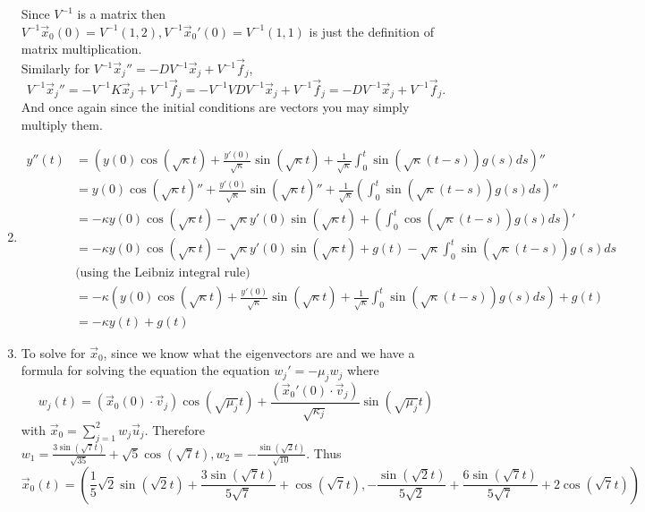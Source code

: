 \documentclass[12pt, letterpaper]{article}
\begin{document}
\begin{enumerate}
$$	 $$
	 Since $V^{-1}$ is a matrix then $V^{-1} \Vec{x}_0 (0) = V^{-1}(1,2),V^{-1} \Vec{x}_0' (0) = V^{-1}(1,1)$ is just the definition of matrix multiplication.\\
	 Similarly for $V^{-1} \Vec{x}_j'' = - D V^{-1} \Vec{x}_j + V^{-1} \Vec{f}_j$,
	 $$
			 V^{-1}\Vec{x}_j'' = 	-V^{-1} K \Vec{x}_j + V^{-1} \Vec{f}_j = - V^{-1} V D V^{-1} \Vec{x}_j  + V^{-1} \Vec{f}_j = -D V^{-1}\Vec{x}_j + V^{-1} \Vec{f}_j.  
	 $$
	 And once again since the initial conditions are vectors you may simply multiply them.
	 \item 
	 \begin{align*}
	 	y''(t) &= (y(0) \cos(\sqrt{\kappa} t) + \frac{y'(0)}{\sqrt{\kappa}}\sin(\sqrt{\kappa} t) + \frac{1}{\sqrt{\kappa}}\int_0^t \sin(\sqrt{\kappa} (t-s)) g(s) ds)''\\
	 	&= y(0) \cos(\sqrt{\kappa} t)'' + \frac{y'(0)}{\sqrt{\kappa}}\sin(\sqrt{\kappa} t)'' + \frac{1}{\sqrt{\kappa}}(\int_0^t \sin(\sqrt{\kappa} (t-s)) g(s) ds)''\\
	 	&= -\kappa y(0) \cos(\sqrt{\kappa} t) - \sqrt{\kappa} y'(0) \sin(\sqrt{\kappa} t) + (\int_0^t \cos(\sqrt{\kappa} (t-s)) g(s) ds)'\\
	 	&= -\kappa y(0) \cos(\sqrt{\kappa} t) - \sqrt{\kappa} y'(0) \sin(\sqrt{\kappa} t) + g(t) - \sqrt{\kappa} \int_0^t \sin(\sqrt{\kappa} (t-s)) g(s) ds \\ 
	 	&\text{(using the Leibniz integral rule)}\\
	 	&= -\kappa(y(0) \cos(\sqrt{\kappa} t) + \frac{y'(0)}{\sqrt{\kappa}}\sin(\sqrt{\kappa} t) + \frac{1}{\sqrt{\kappa}}\int_0^t \sin(\sqrt{\kappa} (t-s)) g(s) ds) + g(t) \\
	 	&= -\kappa y(t) + g(t)
	 \end{align*}
	 \item To solve for $\Vec{x}_0$, since we know what the eigenvectors are and we have a formula for solving the equation the equation $w_j' = -\mu_j w_j$ where 
	 $$
	 	w_j (t) = (\Vec{x}_0 (0) \cdot \Vec{v}_j)\cos(\sqrt{\mu_j} t) + \frac{(\Vec{x}_0' (0) \cdot \Vec{v}_j)}{\sqrt{\kappa_j}} \sin(\sqrt{\mu_j} t)	 
	 $$
	 with $\Vec{x}_0 = \sum_{j=1}^2 w_j \Vec{u}_j$.  Therefore 
	 $ w_1 = \frac{3 \sin \left(\sqrt{7} t\right)}{\sqrt{35}}+\sqrt{5} \cos \left(\sqrt{7}
   t\right),w_2 = -\frac{\sin \left(\sqrt{2} t\right)}{\sqrt{10}}$.
   Thus 
   $$
	\Vec{x}_0 (t) = \left(\frac{1}{5} \sqrt{2} \sin (\sqrt{2} t)+\frac{3 \sin
   (\sqrt{7} t)}{5 \sqrt{7}}+\cos (\sqrt{7} t),-\frac{\sin
   (\sqrt{2} t)}{5 \sqrt{2}}+\frac{6 \sin (\sqrt{7} t)}{5
   \sqrt{7}}+2 \cos (\sqrt{7} t)\right)   
$$
\end{enumerate}
\end{document}

